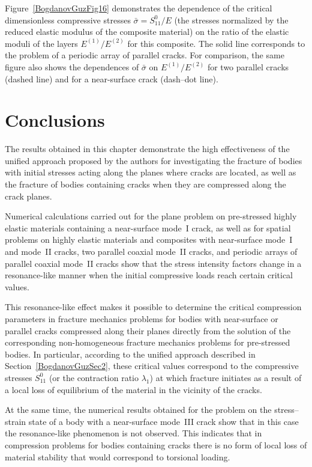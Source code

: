 Figure~\ref{BogdanovGuzFig16} demonstrates the dependence of the
critical dimensionless compressive stresses
$\bar{\sigma}=S_{11}^{0}/E$ (the stresses normalized by the reduced
elastic modulus of the composite material) on the ratio of the elastic
moduli of the layers
$E^{(1)}/E^{(2)}$ for this composite.
The solid line corresponds to the problem of a periodic array of
parallel cracks. For comparison, the same figure also shows the
dependences of $\bar{\sigma}$ on
$E^{(1)}/E^{(2)}$ for two parallel cracks
(dashed line) and for a near-surface crack (dash–dot line).

\section{Conclusions}

The results obtained in this chapter demonstrate the high effectiveness
of the unified approach proposed by the authors for investigating the
fracture of bodies with initial stresses acting along the planes where
cracks are located, as well as the fracture of bodies containing cracks
when they are compressed along the crack planes.

Numerical calculations carried out for the plane problem on pre-stressed
highly elastic materials containing a near-surface mode~I crack, as well
as for spatial problems on highly elastic materials and composites with
near-surface mode~I and mode~II cracks, two parallel coaxial mode~II
cracks, and periodic arrays of parallel coaxial mode~II cracks show that
the stress intensity factors change in a resonance-like manner when the
initial compressive loads reach certain critical values.

This resonance-like effect makes it possible to determine the critical
compression parameters in fracture mechanics problems for bodies with
near-surface or parallel cracks compressed along their planes directly
from the solution of the corresponding non-homogeneous fracture
mechanics problems for pre-stressed bodies. In particular, according to
the unified approach described in Section~\ref{BogdanovGuzSec2}, these critical values
correspond to the compressive stresses $S_{11}^{0}$ (or the contraction
ratio $\lambda_{1}$) at which fracture initiates as a result of a local
loss of equilibrium of the material in the vicinity of the cracks.

At the same time, the numerical results obtained for the problem on the
stress--strain state of a body with a near-surface mode~III crack show
that in this case the resonance-like phenomenon is not observed. This
indicates that in compression problems for bodies containing cracks
there is no form of local loss of material stability that would
correspond to torsional loading.



